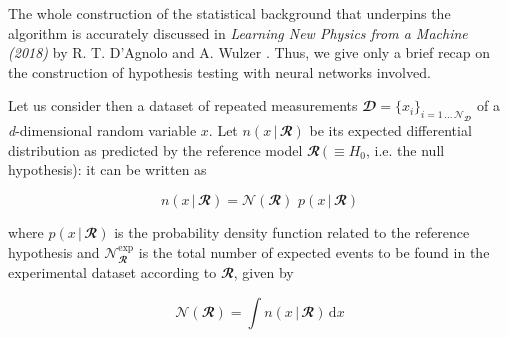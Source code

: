 

\label{sec:foundations}

The whole construction of the statistical background that underpins the algorithm is accurately discussed in
\textit{Learning New Physics from a Machine (2018)} by R. T. D'Agnolo and A. Wulzer \cite{wulzer}. Thus, we give only a
brief recap on the construction of hypothesis testing with neural networks involved. 

Let us consider then a dataset of repeated measurements
$\mathbfcal{D}=\{x_i\}_{i=1\,\ldots\,\mathcal{N}_{\mathbfcal{D}}}$ of a \textit{d}-dimensional random variable $x$. Let
$n(x\,|\,\mathbfcal{R})$ be its expected differential distribution as predicted by the reference model
$\mathbfcal{R}\,(\,\equiv H_0$, i.e. the null hypothesis): it can be written as 

\begin{equation}
    n(x\,|\,\mathbfcal{R}) = \mathcal{N}(\mathbfcal{R})\,\,p(x\,|\,\mathbfcal{R})
\end{equation}

\noindent where $p(x\,|\,\mathbfcal{R})$ is the probability density function related to the reference hypothesis and
$\mathcal{N}_{\mathbfcal{R}}^{\text{exp}}$ is the total number of expected events to be found in the experimental
dataset according to $\mathbfcal{R}$, given by 

\begin{equation}
    \mathcal{N}(\mathbfcal{R})=\int  n(x\,|\,\mathbfcal{R}) \, \text{d}x
\end{equation}


